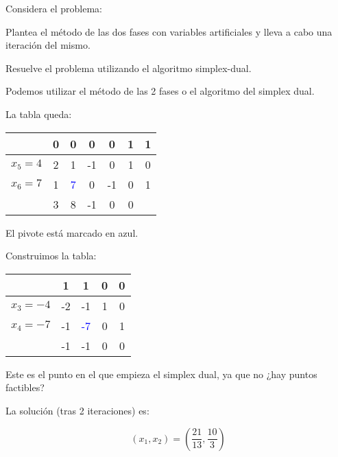 \begin{problem}[10]

Considera el problema:

\begin{ioprob}
\end{ioprob}


\ppart Plantea el método de las dos fases con variables artificiales y lleva a cabo una iteración del mismo.

\ppart Resuelve el problema utilizando el algoritmo simplex-dual. 
\solution

Podemos utilizar el método de las 2 fases o el algoritmo del simplex dual.


\begin{ioprob}
\end{ioprob}

La tabla queda:

\begin{table}[hbtp]
\centering
\begin{tabular}{c|cccccc}
&0&0&0&0&1&1\\
\hline
$x_5=4$&2&1&-1&0&1&0\\
$x_6 = 7$&1&\textcolor{blue}{7}&0&-1&0&1\\
\hline
&3&8&-1&0&0
\end{tabular}
\end{table}

El pivote está marcado en azul.


\begin{ioprob}
\end{ioprob}

Construimos la tabla:

\begin{table}[hbtp]
\centering
\begin{tabular}{c|cccc}
&1&1&0&0\\\hline
$x_3 = -4$&-2&-1&1&0\\
$x_4=-7$&-1&\textcolor{blue}{-7}&0&1\\\hline
&-1&-1&0&0
\end{tabular}
\end{table}

Este es el punto en el que empieza el simplex dual, ya que no ¿hay puntos factibles?

La solución (tras 2 iteraciones) es:

\[
	(x_1,x_2) = \left(\frac{21}{13},\frac{10}{3}\right)
\]

\end{problem}


